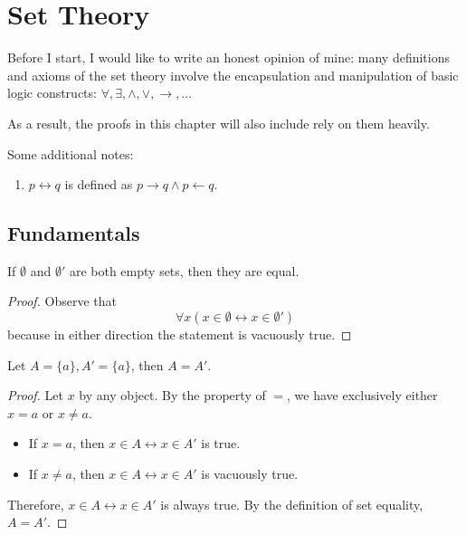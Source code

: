 
\chapter{Set Theory}
Before I start, I would like to write an honest opinion of mine: many definitions and axioms of the set theory involve the encapsulation and manipulation of basic logic constructs: $\forall, \exists, \wedge, \vee, \to, \dots$

As a result, the proofs in this chapter will also include rely on them heavily.

Some additional notes:
\begin{enumerate}
	\item $p \leftrightarrow q$ is defined as $p \to q \wedge p \leftarrow q$.
\end{enumerate}

\section{Fundamentals}
\begin{why}{29}\label{why.unique.empty.set}
If $\emptyset$ and $\emptyset'$ are both empty sets, then they are equal.
\end{why}
\begin{proof}
	Observe that 
	\[
	\forall x (x \in \emptyset \leftrightarrow x \in \emptyset')
	\]
	because in either direction the statement is vacuously true.
\end{proof}

\begin{why}{30}\label{why.eq.singleton.sets}
	Let $A = \{a\}, A' = \{a\}$, then $A = A'$.
\end{why}
\begin{proof}
	Let $x$ by any object. By the property of $=$, we have exclusively either $x=a$ or $x \ne a$.
	
	\begin{itemize}
		\item If $x = a$, then $x \in A \leftrightarrow x \in A'$ is true.
		\item If $x \ne a$, then $x \in A \leftrightarrow x \in A'$ is vacuously true.		
	\end{itemize}

	Therefore, $x \in A \leftrightarrow x \in A'$ is always true. By the definition of set equality, $A = A'$.
\end{proof}

